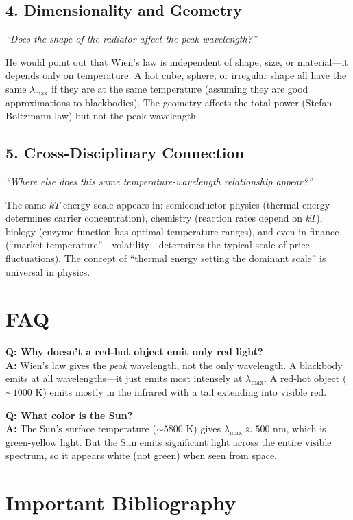 \subsection*{4. Dimensionality and Geometry}
\textit{``Does the shape of the radiator affect the peak wavelength?''}

He would point out that Wien's law is independent of shape, size, or material---it depends only on temperature. A hot cube, sphere, or irregular shape all have the same $\lambda_{\max}$ if they are at the same temperature (assuming they are good approximations to blackbodies). The geometry affects the total power (Stefan-Boltzmann law) but not the peak wavelength.

\subsection*{5. Cross-Disciplinary Connection}
\textit{``Where else does this same temperature-wavelength relationship appear?''}

The same $kT$ energy scale appears in: semiconductor physics (thermal energy determines carrier concentration), chemistry (reaction rates depend on $kT$), biology (enzyme function has optimal temperature ranges), and even in finance (``market temperature''---volatility---determines the typical scale of price fluctuations). The concept of ``thermal energy setting the dominant scale'' is universal in physics.
\section*{FAQ}

\textbf{Q: Why doesn't a red-hot object emit only red light?}\\
\textbf{A:} Wien's law gives the \emph{peak} wavelength, not the only wavelength. A blackbody emits at all wavelengths---it just emits most intensely at $\lambda_{\max}$. A red-hot object ($\sim 1000$ K) emits mostly in the infrared with a tail extending into visible red.

\textbf{Q: What color is the Sun?}\\
\textbf{A:} The Sun's surface temperature ($\sim 5800$ K) gives $\lambda_{\max} \approx 500$ nm, which is green-yellow light. But the Sun emits significant light across the entire visible spectrum, so it appears white (not green) when seen from space.
\section*{Important Bibliography}

